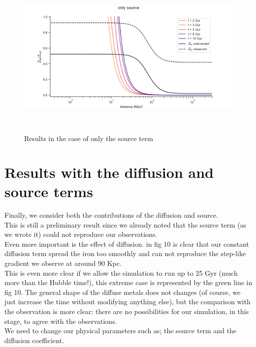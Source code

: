 \documentclass{article}
\begin{document}
\begin{figure}[ht]
 \begin{minipage}[b]{8cm}
   
   \includegraphics[trim= 0 0 0 12,width=15.7cm]{sorgente.png}
   \caption{Results in the case of only the source term}
 \end{minipage}
 \ \hspace{2mm} \hspace{1mm} \
\end{figure}

\newpage



\section{Results with the diffusion and source terms}
Finally, we consider both the contributions of the diffusion and source.\\ This is still a preliminary result since we already noted that the source term (as we wrote it) could not reproduce our observations.\\ Even more important is the effect of diffusion. in fig 10 is clear that our constant diffusion term spread the iron too smoothly and can not reproduce the step-like gradient we observe at around 90 Kpc.\\ This is even more clear if we allow the simulation to run up to 25 Gyr (much more than the Hubble time!), this extreme case is represented by the green line in fig 10. The general shape of the diffuse metals does not changes (of course, we just increase the time without modifying anything else), but the comparison with the observation is more clear: there are no possibilities for our simulation, in this stage, to agree with the observations.\\ We need to change our physical parameters such as; the source term and the diffusion coefficient.
\end{document}
